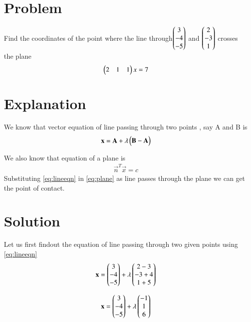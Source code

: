 \documentclass[journal,12pt,twocolumn]{IEEEtran}
\begin{document}
	
\section{Problem}
Find the coordinates of the point where the line through$ \begin{pmatrix}3 \\-4 \\-5\end{pmatrix}$ and $\begin{pmatrix}2 \\-3 \\1\end{pmatrix}$ crosses the plane \begin{align}\begin{pmatrix}2 & 1 & 1\end{pmatrix}x=7 \end{align}

\section{Explanation}\label{Explanation}
We know that vector equation of line passing through two points , say A and B is
\begin{align}
\mathbf{x} = \mathbf{A}+\lambda\begin{pmatrix}\mathbf{B}-\mathbf{A}\end{pmatrix}\label{eq:lineeqn}
\end{align}

We also know that equation of a plane is 
\begin{align}
\vec{n}^T\vec{x}=c\label{eq:plane}
\end{align}
Substituting \eqref{eq:lineeqn} in \eqref{eq:plane} as line passes through the plane we can get the point of contact.

\section{Solution}

Let us first findout the equation of line passing through two given points using \eqref{eq:lineeqn}
\begin{align}
\mathbf{x}=\begin{pmatrix}3 \\-4 \\-5\end{pmatrix}+\lambda 
\begin{pmatrix}2-3 \\-3+4 \\1+5\end{pmatrix}
\end{align}

\begin{align}
\mathbf{x}=\begin{pmatrix}3 \\-4 \\-5\end{pmatrix}+\lambda 
\begin{pmatrix}-1 \\1 \\6\end{pmatrix}\label{eq:lineval}
\end{align}
\end{document}
